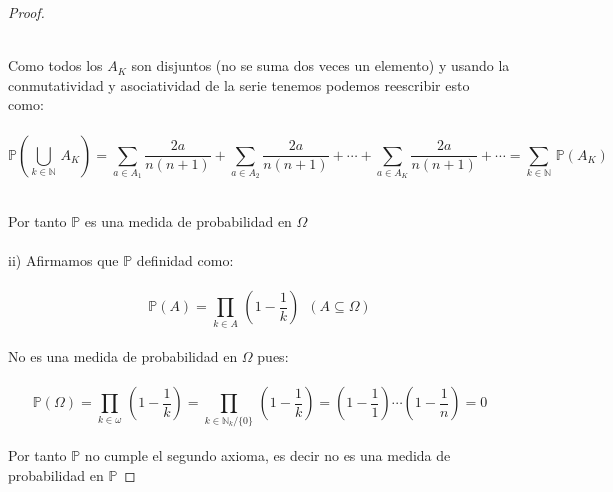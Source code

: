 \documentclass[11pt,letterpaper]{article}
\newcommand{\N}{\mathbb{N}}
\begin{document}
\begin{proof}
\begin{itemize}
\begin{equation*}
        \end{equation*}\,\\
        Como todos los $A_K$ son disjuntos (no se suma dos veces un elemento) y usando la conmutatividad y asociatividad de la serie tenemos podemos reescribir esto como:\,\\
        \,\\
        \begin{equation*}
            \mathbb{P}\left(\bigcup_{k\in \N}\,A_K\right)=\sum_{a\in A_1}\frac{2a}{n(n+1)}+\sum_{a\in A_2}\frac{2a}{n(n+1)}+\cdots+\sum_{a\in A_K}\frac{2a}{n(n+1)}+\cdots=\sum_{k\in \N}\,\mathbb{P}(A_K)
        \end{equation*} 
    \end{itemize}\,\\
    Por tanto $\mathbb{P}$ es una medida de probabilidad en $\Omega$\,\\
    \,\\
    ii)\,\,Afirmamos que $\mathbb{P}$ definidad como:\,\\
    \,\\
    \begin{equation*}
         \mathbb{P}(A)=\prod _{k\in A}\,\left(1-\frac{1}{k}\right)\,\,\,(A\subseteq \Omega)
    \end{equation*}\,\\
    No es una medida de probabilidad en $\Omega$ pues:\,\\
    \,\\
    \begin{equation*}
         \mathbb{P}(\Omega)=\prod _{k\in \omega}\,\left(1-\frac{1}{k}\right)=\prod_{k\in \N_k/\{0\}}\,\left(1-\frac{1}{k}\right)=\left(1-\frac{1}{1}\right)\cdots\left(1-\frac{1}{n}\right)=0
    \end{equation*}\,\\
    Por tanto $\mathbb{P}$ no cumple el segundo axioma, es decir no es una medida de probabilidad en $\mathbb{P}$
    
\end{proof}\,\\
\end{document}
